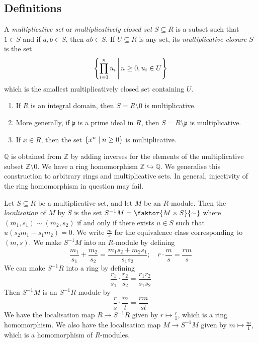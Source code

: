 \subsection{Definitions}
\begin{definition}
    A \emph{multiplicative set} or \emph{multiplicatively closed set} \( S \subseteq R \) is a subset such that \( 1 \in S \) and if \( a, b \in S \), then \( ab \in S \).
    If \( U \subseteq R \) is any set, its \emph{multiplicative closure} \( S \) is the set
    \[ \qty{\prod_{i = 1}^n u_i \,\middle|\,n \geq 0, u_i \in U} \]
    which is the smallest multiplicatively closed set containing \( U \).
\end{definition}
\begin{example}
    \begin{enumerate}
        \item If \( R \) is an integral domain, then \( S = R \setminus \qty{0} \) is multiplicative.
        \item More generally, if \( \mathfrak p \) is a prime ideal in \( R \), then \( S = R \setminus \mathfrak p \) is multiplicative.
        \item If \( x \in R \), then the set \( \qty{x^n \mid n \geq 0} \) is multiplicative.
    \end{enumerate}
\end{example}
\begin{remark}
    \( \mathbb Q \) is obtained from \( \mathbb Z \) by adding inverses for the elements of the multiplicative subset \( \mathbb Z \setminus \qty{0} \).
    We have a ring homomorphism \( \mathbb Z \hookrightarrow \mathbb Q \).
    We generalise this construction to arbitrary rings and multiplicative sets.
    In general, injectivity of the ring homomorphism in question may fail.
\end{remark}
\begin{definition}
    Let \( S \subseteq R \) be a multiplicative set, and let \( M \) be an \( R \)-module.
    Then the \emph{localisation} of \( M \) by \( S \) is the set \( S^{-1} M = \faktor{M \times S}{\sim} \) where \( (m_1, s_1) \sim (m_2, s_2) \) if and only if there exists \( u \in S \) such that \( u(s_2 m_1 - s_1 m_2) = 0 \).
    We write \( \frac{m}{s} \) for the equivalence class corresponding to \( (m, s) \).
    We make \( S^{-1} M \) into an \( R \)-module by defining
    \[ \frac{m_1}{s_1} + \frac{m_2}{s_2} = \frac{m_1 s_2 + m_2 s_1}{s_1 s_2};\quad r \cdot \frac{m}{s} = \frac{rm}{s} \]
    We can make \( S^{-1} R \) into a ring by defining
    \[ \frac{r_1}{s_1} \cdot \frac{r_2}{s_2} = \frac{r_1 r_2}{s_1 s_2} \]
    Then \( S^{-1}M \) is an \( S^{-1}R \)-module by
    \[ \frac{r}{s} \cdot \frac{m}{t} = \frac{r m}{s t} \]
    We have the localisation map \( R \to S^{-1}R \) given by \( r \mapsto \frac{r}{1} \), which is a ring homomorphism.
    We also have the localisation map \( M \to S^{-1}M \) given by \( m \mapsto \frac{m}{1} \), which is a homomorphism of \( R \)-modules.
\end{definition}
